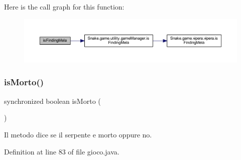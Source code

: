 Here is the call graph for this function\+:
\nopagebreak
\begin{figure}[H]
\begin{center}
\leavevmode
\includegraphics[width=350pt]{class_snake_1_1game_1_1gioco_a627e7ff59c6e578230c0e1d99791cb57_cgraph}
\end{center}
\end{figure}
\mbox{\label{class_snake_1_1game_1_1gioco_a4bfdf00a78db51587515ac33ff8b6640}} 
\subsubsection{\texorpdfstring{is\+Morto()}{isMorto()}}
{\footnotesize\ttfamily synchronized boolean is\+Morto (\begin{DoxyParamCaption}{ }\end{DoxyParamCaption})}



Il metodo dice se il serpente e\textquotesingle{} morto oppure no. 



Definition at line 83 of file gioco.\+java.

